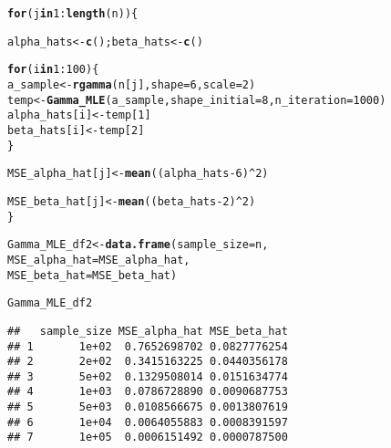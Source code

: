 \documentclass[11pt, a4paper]{article}\usepackage[]{graphicx}\usepackage[]{xcolor}
\makeatletter
\newcommand{\hlnum}[1]{\textcolor[rgb]{0.686,0.059,0.569}{#1}}%
\newcommand{\hlopt}[1]{\textcolor[rgb]{0,0,0}{#1}}%
\newcommand{\hldef}[1]{\textcolor[rgb]{0.345,0.345,0.345}{#1}}%
\newcommand{\hlkwa}[1]{\textcolor[rgb]{0.161,0.373,0.58}{\textbf{#1}}}%
\newcommand{\hlkwb}[1]{\textcolor[rgb]{0.69,0.353,0.396}{#1}}%
\newcommand{\hlkwc}[1]{\textcolor[rgb]{0.333,0.667,0.333}{#1}}%
\newcommand{\hlkwd}[1]{\textcolor[rgb]{0.737,0.353,0.396}{\textbf{#1}}}%
\newenvironment{kframe}{%
 \def\at@end@of@kframe{}%
 \ifinner\ifhmode%
  \def\at@end@of@kframe{\end{minipage}}%
  \begin{minipage}{\columnwidth}%
 \fi\fi%
 \def\FrameCommand##1{\hskip\@totalleftmargin \hskip-\fboxsep
 \colorbox{shadecolor}{##1}\hskip-\fboxsep
     \hskip-\linewidth \hskip-\@totalleftmargin \hskip\columnwidth}%
 \MakeFramed {\advance\hsize-\width
   \@totalleftmargin\z@ \linewidth\hsize
   \@setminipage}}%
 {\par\unskip\endMakeFramed%
 \at@end@of@kframe}
\newenvironment{knitrout}{}{} %
\makeatother
\begin{document}
\begin{knitrout}
\color{fgcolor}\begin{kframe}
\begin{alltt}
\hlkwa{for}\hldef{(j} \hlkwa{in} \hlnum{1}\hlopt{:}\hlkwd{length}\hldef{(n))\{}

  \hldef{alpha_hats} \hlkwb{<-} \hlkwd{c}\hldef{(); beta_hats} \hlkwb{<-} \hlkwd{c}\hldef{()}

  \hlkwa{for} \hldef{(i} \hlkwa{in} \hlnum{1}\hlopt{:}\hlnum{100}\hldef{) \{}
    \hldef{a_sample} \hlkwb{<-} \hlkwd{rgamma}\hldef{(n[j],} \hlkwc{shape} \hldef{=} \hlnum{6}\hldef{,} \hlkwc{scale} \hldef{=} \hlnum{2}\hldef{)}
    \hldef{temp} \hlkwb{<-} \hlkwd{Gamma_MLE}\hldef{(a_sample,} \hlkwc{shape_initial} \hldef{=} \hlnum{8}\hldef{,} \hlkwc{n_iteration} \hldef{=} \hlnum{1000}\hldef{)}
    \hldef{alpha_hats[i]} \hlkwb{<-} \hldef{temp[}\hlnum{1}\hldef{]}
    \hldef{beta_hats[i]} \hlkwb{<-} \hldef{temp[}\hlnum{2}\hldef{]}
  \hldef{\}}

  \hldef{MSE_alpha_hat[j]} \hlkwb{<-} \hlkwd{mean}\hldef{( (alpha_hats} \hlopt{-} \hlnum{6}\hldef{)}\hlopt{^}\hlnum{2} \hldef{)}

  \hldef{MSE_beta_hat[j]} \hlkwb{<-} \hlkwd{mean}\hldef{( (beta_hats} \hlopt{-} \hlnum{2}\hldef{)}\hlopt{^}\hlnum{2} \hldef{)}
\hldef{\}}
\end{alltt}
\end{kframe}
\end{knitrout}

\begin{knitrout}
\color{fgcolor}\begin{kframe}
\begin{alltt}
\hldef{Gamma_MLE_df2} \hlkwb{<-} \hlkwd{data.frame}\hldef{(}\hlkwc{sample_size} \hldef{= n,}
                            \hlkwc{MSE_alpha_hat} \hldef{= MSE_alpha_hat,}
                            \hlkwc{MSE_beta_hat} \hldef{= MSE_beta_hat)}
\end{alltt}
\end{kframe}
\end{knitrout}

\begin{knitrout}
\color{fgcolor}\begin{kframe}
\begin{alltt}
\hldef{Gamma_MLE_df2}
\end{alltt}
\begin{verbatim}
##   sample_size MSE_alpha_hat MSE_beta_hat
## 1       1e+02  0.7652698702 0.0827776254
## 2       2e+02  0.3415163225 0.0440356178
## 3       5e+02  0.1329508014 0.0151634774
## 4       1e+03  0.0786728890 0.0090687753
## 5       5e+03  0.0108566675 0.0013807619
## 6       1e+04  0.0064055883 0.0008391597
## 7       1e+05  0.0006151492 0.0000787500
\end{verbatim}
\end{kframe}
\end{knitrout}
\end{document}
